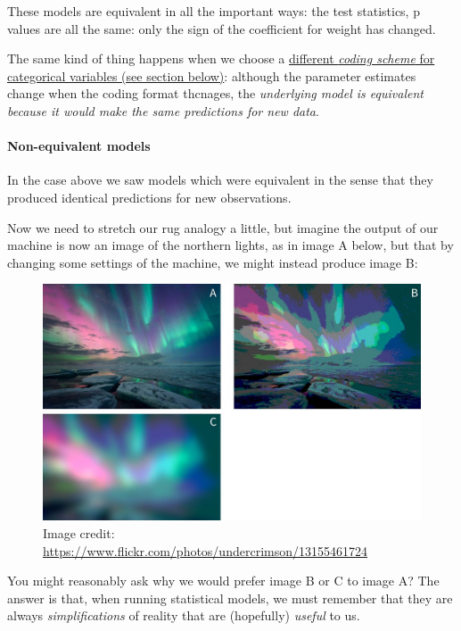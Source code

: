 \documentclass[]{article}
\let\oldparagraph\paragraph
\renewcommand{\paragraph}[1]{\oldparagraph{#1}\mbox{}}
\begin{document}
These models are equivalent in all the important ways: the test statistics, p
values are all the same: only the sign of the coefficient for weight has
changed.

The same kind of thing happens when we choose a
\protect\hyperlink{regression-coding}{different \emph{coding scheme} for categorical variables (see section below)}:
although the parameter estimates change when the coding format thcnages, the
\emph{underlying model is equivalent because it would make the same predictions for
new data}.

\hypertarget{non-equivalent-models}{%
\paragraph{Non-equivalent models}\label{non-equivalent-models}}

In the case above we saw models which were equivalent in the sense that they
produced identical predictions for new observations.

Now we need to stretch our rug analogy a little, but imagine the output of our
machine is now an image of the northern lights, as in image A below, but that by
changing some settings of the machine, we might instead produce image B:

\begin{figure}
\centering
\includegraphics{media/aurora.jpg}
\caption{Image credit: \url{https://www.flickr.com/photos/undercrimson/13155461724}}
\end{figure}

You might reasonably ask why we would prefer image B or C to image A? The answer
is that, when running statistical models, we must remember that they are always
\emph{simplifications} of reality that are (hopefully) \emph{useful} to us.
\end{document}
